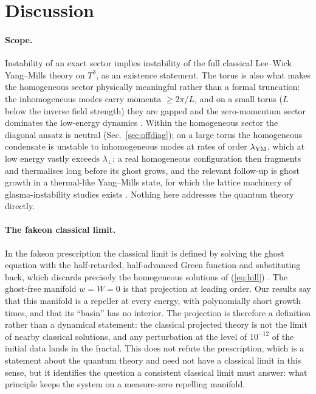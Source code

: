 \documentclass[11pt,a4paper]{article}
\newcommand{\YM}{{\rm YM}}
\begin{document}
\section{Discussion}
\label{sec:discussion}

\paragraph{Scope.} Instability of an exact sector implies instability of the full classical
Lee--Wick Yang--Mills theory on $T^3$, as an existence statement. The torus is also what makes
the homogeneous sector physically meaningful rather than a formal truncation: the inhomogeneous
modes carry momenta $\ge2\pi/L$, and on a small torus ($L$ below the inverse field strength)
they are gapped and the zero-momentum sector dominates the low-energy dynamics
\cite{Luscher83}. Within the homogeneous sector the diagonal ansatz is neutral
(Sec.~\ref{sec:offdiag}); on a large torus the homogeneous condensate is unstable to
inhomogeneous modes at rates of order $\lambda_\YM$, which at low energy vastly exceeds
$\lambda_\perp$; a real homogeneous configuration then fragments and thermalises long before its
ghost grows, and the relevant follow-up is ghost growth in a thermal-like
Yang--Mills state, for which the lattice machinery of glasma-instability studies exists
\cite{MullerTrayanov,Kunihiro}. Nothing here addresses the quantum theory directly.

\paragraph{The fakeon classical limit.} In the fakeon prescription the classical limit is
defined by solving the ghost equation with the half-retarded, half-advanced Green function and
substituting back, which discards precisely the homogeneous solutions of (\ref{eq:hill})
\cite{Anselmi18}. The ghost-free manifold $w=W=0$ is that projection at leading order. Our
results say that this manifold is a repeller at every energy, with polynomially short growth
times, and that its ``basin'' has no interior. The projection is therefore a definition rather
than a dynamical statement: the classical projected theory is not the limit of nearby classical
solutions, and any perturbation at the level of $10^{-12}$ of the initial data lands in the
fractal. This does not refute the prescription, which is a statement about the quantum theory and
need not have a classical limit in this sense, but it identifies the question a consistent
classical limit must answer: what principle keeps the system on a measure-zero repelling manifold.
\end{document}
